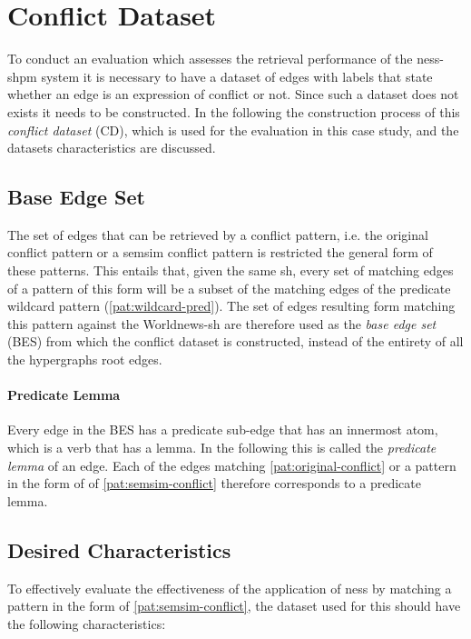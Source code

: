 \documentclass[11pt]{scrreprt}
\begin{document}
{\section{Conflict Dataset}
\label{sec:conflict-dataset}
To conduct an evaluation which assesses the retrieval performance of the \gls{ness-shpm} system it is necessary to have a dataset of edges with labels that state whether an edge is an expression of conflict or not. Since such a dataset does not exists it needs to be constructed. In the following the construction process of this \textit{conflict dataset} (CD), which is used for the evaluation in this case study, and the datasets characteristics are discussed.



\subsection{Base Edge Set}
\label{sec:base-edge-set}
The set of edges that can be retrieved by a conflict pattern, i.e. the original conflict pattern or a semsim conflict pattern is restricted the general form of these patterns. This entails that, given the same \gls{sh}, every set of matching edges of a pattern of this form will be a subset of the matching edges of the predicate wildcard pattern (\cref{pat:wildcard-pred}). The set of edges resulting form matching this pattern against the Worldnews-\gls{sh} are therefore used as the \textit{base edge set} (BES) from which the conflict dataset is constructed, instead of the entirety of all the hypergraphs root edges.

\paragraph{Predicate Lemma} Every edge in the BES has a predicate sub-edge that has an innermost atom, which is a verb that has a lemma. In the following this is called the \textit{predicate lemma} of an edge. Each of the edges matching \cref{pat:original-conflict} or a pattern in the form of of \cref{pat:semsim-conflict} therefore corresponds to a predicate lemma.


\subsection{Desired Characteristics}
\label{sec:dataset-characteristics}
To effectively evaluate the effectiveness of the application of \gls{ness} by matching a pattern in the form of \cref{pat:semsim-conflict}, the dataset used for this should have the following characteristics:

}
\end{document}

